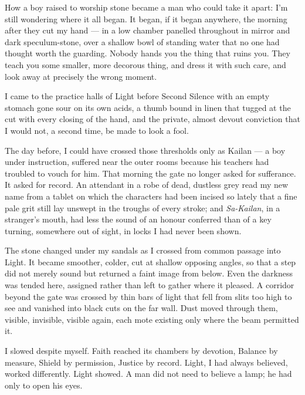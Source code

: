 
How a boy raised to worship stone became a man who could take it apart: I'm still wondering where it all began.
It began, if it began anywhere, the morning after they cut my hand --- in a low chamber panelled throughout in mirror and dark speculum-stone, over a shallow bowl of standing water that no one had thought worth the guarding.
Nobody hands you the thing that ruins you. They teach you some smaller, more decorous thing, and dress it with such care, and look away at precisely the wrong moment.\par

\ornament

I came to the practice halls of Light before Second Silence with an empty stomach gone sour on its own acids, a thumb bound in linen that tugged at the cut with every closing of the hand, and the private, almost devout conviction that I would not, a second time, be made to look a fool.\par

The day before, I could have crossed those thresholds only as Kailan --- a boy under instruction, suffered near the outer rooms because his teachers had troubled to vouch for him.
That morning the gate no longer asked for sufferance.
It asked for record.
An attendant in a robe of dead, dustless grey read my new name from a tablet on which the characters had been incised so lately that a fine pale grit still lay unswept in the troughs of every stroke;
and \textit{Sa-Kailan}, in a stranger's mouth, had less the sound of an honour conferred than of a key turning, somewhere out of sight, in locks I had never been shown.\par

The stone changed under my sandals as I crossed from common passage into Light. It became smoother, colder, cut at shallow opposing angles, so that a step did not merely
sound but returned a faint image from below.
Even the darkness was tended here, assigned rather than left to gather where it pleased.
A corridor beyond the gate was crossed by thin bars of light that fell from slits too high to see and vanished into black cuts on the far wall.
Dust moved through them, visible, invisible, visible again, each mote existing only where the beam permitted it.\par

I slowed despite myself. Faith reached its chambers by devotion, Balance by measure, Shield by permission, Justice by record.
Light, I had always believed, worked differently. Light showed. A man did not need to believe a lamp; he had only to open his eyes.\par

